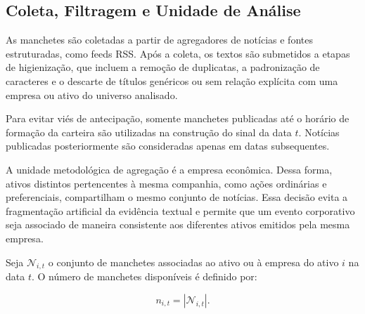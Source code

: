 \subsection{Coleta, Filtragem e Unidade de Análise}
\label{subsec:coleta_filtragem}

As manchetes são coletadas a partir de agregadores de notícias e fontes estruturadas, como feeds RSS. Após a coleta, os textos são submetidos a etapas de higienização, que incluem a remoção de duplicatas, a padronização de caracteres e o descarte de títulos genéricos ou sem relação explícita com uma empresa ou ativo do universo analisado.

Para evitar viés de antecipação, somente manchetes publicadas até o horário de formação da carteira são utilizadas na construção do sinal da data $t$. Notícias publicadas posteriormente são consideradas apenas em datas subsequentes.

A unidade metodológica de agregação é a empresa econômica. Dessa forma, ativos distintos pertencentes à mesma companhia, como ações ordinárias e preferenciais, compartilham o mesmo conjunto de notícias. Essa decisão evita a fragmentação artificial da evidência textual e permite que um evento corporativo seja associado de maneira consistente aos diferentes ativos emitidos pela mesma empresa.

Seja $\mathcal{N}_{i,t}$ o conjunto de manchetes associadas ao ativo ou à empresa do ativo $i$ na data $t$. O número de manchetes disponíveis é definido por:

\begin{equation}
    n_{i,t}
    =
    \left|
        \mathcal{N}_{i,t}
    \right|.
    \label{eq:numero_noticias}
\end{equation}

